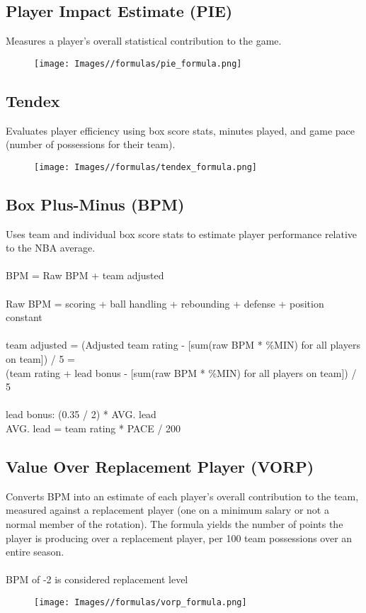 \documentclass{article}
\begin{document}
\subsection{Player Impact Estimate (PIE)}
Measures a player’s overall statistical contribution to the game.
\begin{figure}[H]
    \centering
    \texttt{[image: Images//formulas/pie\_formula.png]}
    \label{fig:formula-8}
\end{figure}

\subsection{Tendex}
Evaluates player efficiency using box score stats, minutes played, and game pace (number of possessions for their team).
\begin{figure}[H]
    \centering
    \texttt{[image: Images//formulas/tendex\_formula.png]}
    \label{fig:formula-9}
\end{figure}

\subsection{Box Plus-Minus (BPM)}
Uses team and individual box score stats to estimate player performance relative to the NBA average.\\
\\
BPM = Raw BPM + team adjusted\\
\\
Raw BPM = scoring + ball handling + rebounding + defense + position constant\\
\\
team adjusted = (Adjusted team rating - [sum(raw BPM * \%MIN) for all players on team]) / 5 = \\
(team rating + lead bonus - [sum(raw BPM * \%MIN) for all players on team]) / 5\\
\\
lead bonus: (0.35 / 2) * AVG. lead\\
AVG. lead = team rating * PACE / 200

\subsection{Value Over Replacement Player (VORP)}
Converts BPM into an estimate of each player’s overall contribution to the team, measured against a replacement player (one on a minimum salary or not a normal member of the rotation). The formula yields the number of points the player is producing over a replacement player, per 100 team possessions over an entire season.\\
\\
BPM of -2 is considered replacement level
\begin{figure}[H]
    \centering
    \texttt{[image: Images//formulas/vorp\_formula.png]}
    \label{fig:formula-10}
\end{figure}
\newpage
\end{document}
